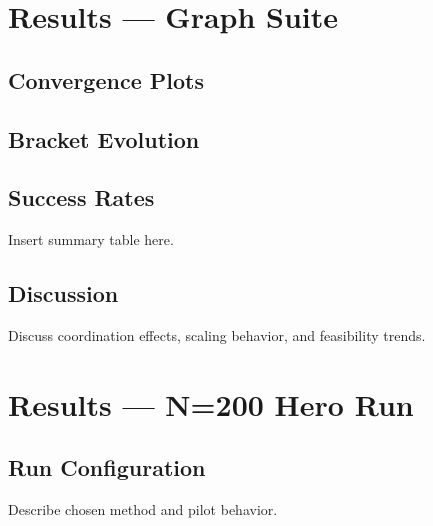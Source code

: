 \documentclass[11pt]{report}
\newcommand{\Lbest}{L_{\text{best}}}
\newcommand{\figdir}{figures}
\begin{document}
\chapter{Results — Graph Suite}

\section{Convergence Plots}


\section{Bracket Evolution}


\section{Success Rates}

Insert summary table here.

\section{Discussion}

Discuss coordination effects, scaling behavior, and feasibility trends.

\chapter{Results — N=200 Hero Run}

\section{Run Configuration}

Describe chosen method and pilot behavior.
\end{document}

